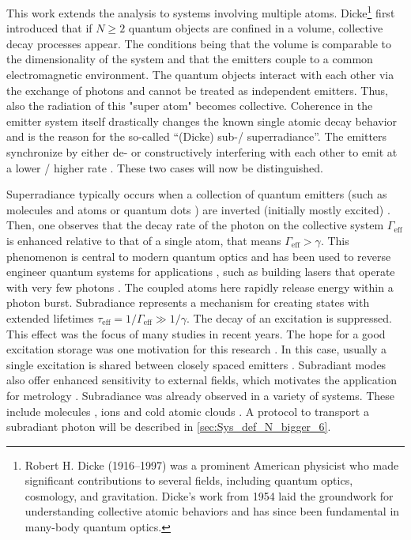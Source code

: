 \noindent
This work extends the analysis to systems involving multiple atoms.
Dicke\footnote{Robert H. Dicke (1916--1997) was a prominent American physicist
    who made significant contributions to several fields, including quantum optics, cosmology, and gravitation.
    Dicke's work from 1954 \cite{Dicke1954} laid the groundwork for understanding collective atomic behaviors
    and has since been fundamental in many-body quantum optics.} first introduced
that if $N \geq 2$ quantum objects are confined in a volume,
collective decay processes appear.
The conditions being that the volume is comparable to the dimensionality of the system and that the emitters couple to a common electromagnetic environment.
The quantum objects interact with each other via the exchange of photons and cannot be treated as independent emitters.
Thus, also the radiation of this "super atom" becomes collective.
Coherence in the emitter system itself \cite{Benedict1996} drastically changes the known single atomic decay behavior
and is the reason for the so-called “(Dicke) sub-/ superradiance”.
The emitters synchronize by either de- or constructively interfering with each other to emit at a lower / higher rate \cite{Masson2022}.
These two cases will now be distinguished.


\noindent
Superradiance typically occurs when a collection of quantum emitters (such as molecules and atoms \cite{GROSS1982301} or quantum dots \cite{Lodahl2004}) are inverted (initially mostly excited) \cite{RubiesBigorda2022}.
Then, one observes that the decay rate of the photon on the collective system $ \Gamma_{\text{eff}} $ is enhanced relative to that of a single atom, that means $\Gamma_{\text{eff}} > \gamma$.
This phenomenon is central to modern quantum optics
and has been used to reverse engineer quantum systems for applications \cite{Longo2016},
such as building lasers that operate with very few photons \cite{Bohnet2012}.
The coupled atoms here rapidly release energy within a photon burst.
Subradiance represents a mechanism for creating states with extended lifetimes $\tau_{\text{eff}} = 1 / \Gamma_{\text{eff}} \gg 1 / \gamma$.
The decay of an excitation is suppressed.
This effect was the focus of many studies in recent years.
The hope for a good excitation storage was one motivation for this research \cite{AsenjoGarcia2017, Jen2016}.
In this case, usually a single excitation is shared between closely spaced emitters \cite{AsenjoGarcia2017}.
Subradiant modes also offer enhanced sensitivity to external fields, which motivates the application for metrology \cite{Facchinetti2018, Ostermann2013, Plankensteiner2015}.
Subradiance was already observed in a variety of systems.
These include molecules \cite{Takasu2012, McGuyer2015}, ions \cite{DeVoe1996} and cold atomic clouds \cite{Guerin2016, Das2020}.
A protocol to transport a subradiant photon will be described in \autoref{sec:Sys_def_N_bigger_6}.

